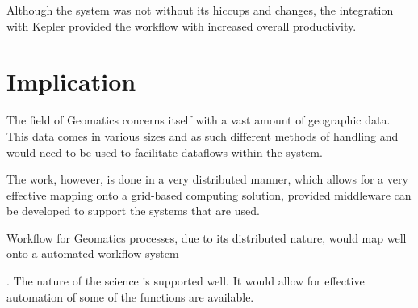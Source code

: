       Although the system was not without its hiccups and changes, the
      integration with Kepler provided the workflow with increased overall
      productivity.


\section{Implication}
The field of Geomatics concerns itself with a vast amount of geographic data.
This data comes in various sizes and as such different methods of handling and
would need to be used to facilitate dataflows within the system.

The work, however, is done in a very distributed manner, which allows for a very
effective mapping onto a grid-based computing solution, provided middleware can
be developed to support the systems that are
used\cite{Montella:2007:UGC:1272980.1272995}.

Workflow for Geomatics processes, due to its distributed nature, would map well
onto a automated workflow system

\cite{Withana:2010:VWE:1851476.1851586}. The nature of the science is supported
well. It would allow for effective automation of some of the functions are
available.
